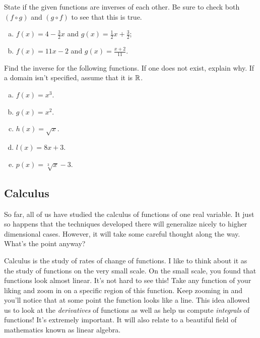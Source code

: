     \begin{problem}
    State if the given functions are inverses of each other. Be sure to check both $(f\circ g)$ and $(g\circ f)$ to see that this is true.
    \begin{enumerate}[(a)]
        \item $\displaystyle{f(x)=4-\frac{3}{2}x}$ and $g(x)=\displaystyle{\frac{1}{2}x+\frac{3}{2}}$;
        \item $f(x)=11x-2$ and $\displaystyle{g(x)=\frac{x+2}{11}}$.
    \end{enumerate}
    \end{problem}

    \begin{problem}
    Find the inverse for the following functions. If one does not exist, explain why. If a domain isn't specified, assume that it is $\mathbb{R}$.
    \begin{enumerate}[(a)]
        \item $f(x)=x^3$.
        \item $g(x)=x^2$.
        \item $h(x)=\sqrt{x}$.
        \item $l(x)=8x+3$.
        \item $p(x)=\sqrt[3]{x}-3$.
    \end{enumerate}
    \end{problem}



    \subsection{Calculus}

    So far, all of us have studied the calculus of functions of one real variable.  It just so happens that the techniques developed there will generalize nicely to higher dimensional cases.  However, it will take some careful thought along the way.  What's the point anyway?

    Calculus is the study of rates of change of functions.  I like to think about it as the study of functions on the very small scale.  On the small scale, you found that functions look almost linear.  It's not hard to see this!  Take any function of your liking and zoom in on a specific region of this function. Keep zooming in and you'll notice that at some point the function looks like a line.  This idea allowed us to look at the \emph{derivatives} of functions as well as help us compute \emph{integrals} of functions!  It's extremely important.  It will also relate to a beautiful field of mathematics known as linear algebra.

